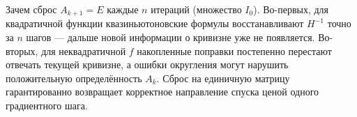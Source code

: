 \begin{idea}
Зачем сброс $A_{k+1} = E$ каждые $n$ итераций (множество $I_0$). Во-первых,
для квадратичной функции квазиньютоновские формулы восстанавливают $H^{-1}$
точно за $n$ шагов — дальше новой информации о кривизне уже не появляется.
Во-вторых, для неквадратичной $f$ накопленные поправки постепенно перестают
отвечать текущей кривизне, а ошибки округления могут нарушить положительную
определённость $A_k$. Сброс на единичную матрицу гарантированно возвращает
корректное направление спуска ценой одного градиентного шага.
\end{idea}
